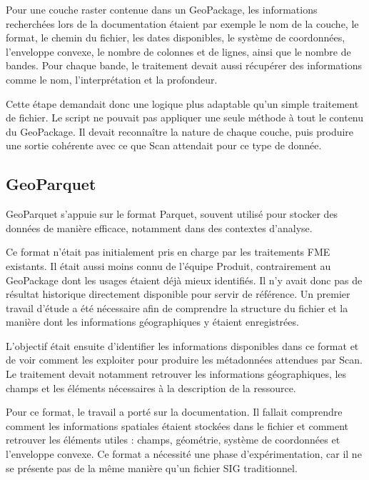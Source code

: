 Pour une couche raster contenue dans un GeoPackage, les informations recherchées lors de la documentation
étaient par exemple le nom de la couche, le format, le chemin du fichier, les
dates disponibles, le système de coordonnées, l'enveloppe convexe, le nombre de colonnes
et de lignes, ainsi que le nombre de bandes. Pour chaque bande, le traitement
devait aussi récupérer des informations comme le nom, l'interprétation et la
profondeur.

Cette étape demandait donc une logique plus adaptable qu'un simple traitement de
fichier. Le script ne pouvait pas appliquer une seule méthode à tout le contenu
du GeoPackage. Il devait reconnaître la nature de chaque couche, puis produire
une sortie cohérente avec ce que Scan attendait pour ce type de donnée.


\subsection{GeoParquet}
\label{subsec:geoparquet}

GeoParquet s'appuie sur le format Parquet, souvent utilisé pour stocker des
données de manière efficace, notamment dans des contextes d'analyse.

Ce format n'était pas initialement pris en charge par les traitements FME
existants. Il était aussi moins connu de l'équipe Produit, contrairement au
GeoPackage dont les usages étaient déjà mieux identifiés. Il n'y avait donc pas
de résultat historique directement disponible pour servir de référence. Un
premier travail d'étude a été nécessaire afin de comprendre la structure du
fichier et la manière dont les informations géographiques y étaient
enregistrées.

L'objectif était ensuite d'identifier les informations disponibles dans ce
format et de voir comment les exploiter pour produire les métadonnées attendues
par Scan. Le traitement devait notamment retrouver les informations
géographiques, les champs et les éléments nécessaires à la description de la
ressource.

Pour ce format, le travail a porté sur la documentation. Il fallait comprendre
comment les informations spatiales étaient stockées dans le fichier et comment
retrouver les éléments utiles : champs, géométrie, système de coordonnées et
l'enveloppe convexe. Ce format a nécessité une phase d'expérimentation, car il ne se
présente pas de la même manière qu'un fichier SIG traditionnel.


